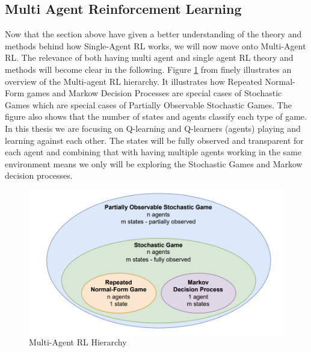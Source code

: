 \documentclass{article}
\begin{document}
\subsection{Multi Agent Reinforcement Learning}
Now that the section above have given a better understanding of the theory and methods behind how Single-Agent RL works, we will now move onto Multi-Agent RL. The relevance of both having multi agent and single agent RL theory and methods will become clear in the following. Figure \ref{fig:marside44} from \citep[p. 44]{marl-book} finely illustrates an overview of the Multi-agent RL hierarchy. It illustrates how Repeated Normal-Form games and Markow Decision Processes are special cases of Stochastic Games which are special cases of Partially Observable Stochastic Games. The figure also shows that the number of states and agents classify each type of game. In this thesis we are focusing on Q-learning and Q-learners (agents) playing and learning against each other. The states will be fully observed and transparent for each agent and combining that with having multiple agents working in the same environment means we only will be exploring the Stochastic Games and Markow decision processes.
\begin{figure}[H]
    \centering
    \includegraphics[width=0.5\linewidth]{Multi-agent-figure.png}
    \caption{Multi-Agent RL Hierarchy }
    \label{fig:marside44}
\end{figure}
\end{document}
